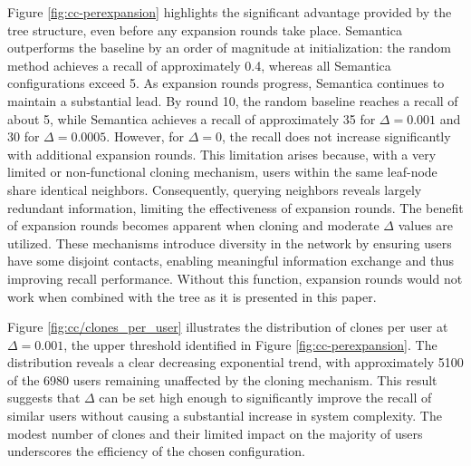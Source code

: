 \documentclass[10pt,journal]{IEEEtran}
\begin{document}
Figure \ref{fig:cc-perexpansion} highlights the significant advantage provided by the tree structure, even before any expansion rounds take place. Semantica outperforms the baseline by an order of magnitude at initialization: the random method achieves a recall of approximately 0.4, whereas all Semantica configurations exceed 5.
As expansion rounds progress, Semantica continues to maintain a substantial lead. By round 10, the random baseline reaches a recall of about 5, while Semantica achieves a recall of approximately 35 for $\Delta = 0.001$ and 30 for $\Delta = 0.0005$. However, for $\Delta = 0$, the recall does not increase significantly with additional expansion rounds. This limitation arises because, with a very limited or non-functional cloning mechanism, users within the same leaf-node share identical neighbors. Consequently, querying neighbors reveals largely redundant information, limiting the effectiveness of expansion rounds.
The benefit of expansion rounds becomes apparent when cloning and moderate $\Delta$ values are utilized. These mechanisms introduce diversity in the network by ensuring users have some disjoint contacts, enabling meaningful information exchange and thus improving recall performance.
Without this function, expansion rounds would not work when combined with the tree as it is presented in this paper.

%             

Figure \ref{fig:cc/clones_per_user} illustrates the distribution of clones per user at $\Delta = 0.001$, the upper threshold identified in Figure \ref{fig:cc-perexpansion}. The distribution reveals a clear decreasing exponential trend, with approximately 5100 of the 6980 users remaining unaffected by the cloning mechanism. This result suggests that $\Delta$ can be set high enough to significantly improve the recall of similar users without causing a substantial increase in system complexity. The modest number of clones and their limited impact on the majority of users underscores the efficiency of the chosen configuration.
\end{document}
